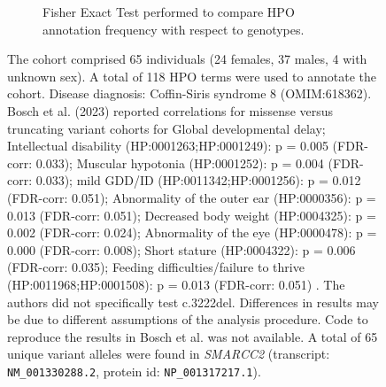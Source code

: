 \begin{figure}[htbp]
\begin{subfigure}[b]{0.95\textwidth}
\centering
{}
\captionsetup{justification=raggedright,singlelinecheck=false}
\caption{Fisher Exact Test performed to compare HPO annotation frequency with respect to genotypes.}
\end{subfigure}


\caption{The cohort comprised 65 individuals (24 females, 37 males, 4 with unknown sex). A total of 118 HPO terms were used to annotate the cohort. 
Disease diagnosis: Coffin-Siris syndrome 8 (OMIM:618362). Bosch et al. (2023) reported correlations for  missense versus truncating variant cohorts for 
Global developmental delay; Intellectual disability (HP:0001263;HP:0001249): p = 0.005 (FDR-corr: 0.033); Muscular hypotonia (HP:0001252): p = 0.004 (FDR-corr: 0.033);
mild GDD/ID (HP:0011342;HP:0001256): p = 0.012 (FDR-corr: 0.051); Abnormality of the outer ear (HP:0000356): p = 0.013 (FDR-corr: 0.051); 
Decreased body weight (HP:0004325): p = 0.002 (FDR-corr: 0.024); Abnormality of the eye (HP:0000478): p = 0.000 (FDR-corr: 0.008);
Short stature (HP:0004322): p = 0.006 (FDR-corr: 0.035); Feeding difficulties/failure to thrive (HP:0011968;HP:0001508): p = 0.013 (FDR-corr: 0.051) \cite{PMID_37551667}. 
The authors did not specifically test c.3222del. Differences in results may be due to different assumptions of the analysis procedure. Code to reproduce the results in 
Bosch et al. was not available. A total of 65 unique variant alleles were found in \textit{SMARCC2} (transcript: \texttt{NM\_001330288.2}, protein id: \texttt{NP\_001317217.1}).}
\end{figure}
